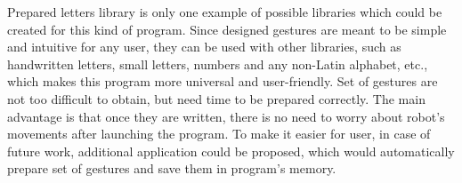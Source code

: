 Prepared letters library is only one example of possible libraries which could be created for this kind of program. Since designed gestures are meant to be simple and intuitive for any user, they can be used with other libraries, such as handwritten letters, small letters, numbers and any non-Latin alphabet, etc., which makes this program more universal and user-friendly. Set of gestures are not too difficult to obtain, but need time to be prepared correctly. The main advantage is that once they are written, there is no need to worry about robot’s movements after launching the program. To make it easier for user, in case of future work, additional application could be proposed, which would automatically prepare set of gestures and save them in program’s memory. 

